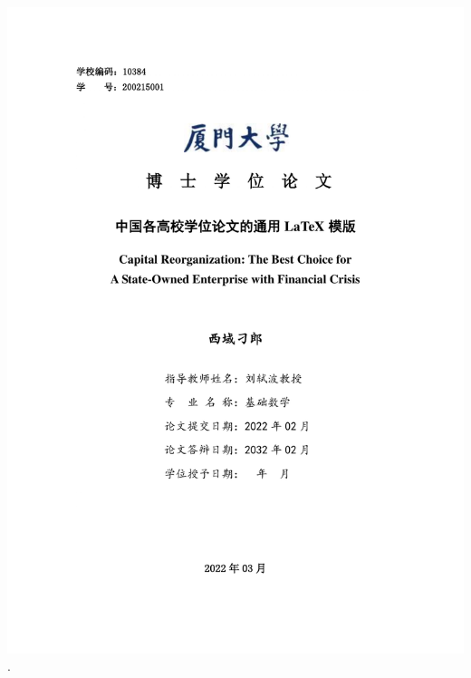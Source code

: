 \documentclass[12pt]{ctexbook}
\newcommand{\chap}[1]{\chapter{#1}\fancyhead[CE]{第\CJKnumber{\thechapter}章\quad
#1}\fancyhead[CO]{\S\rightmark}}
\theoremstyle{definition}
\theoremstyle{remark}
\begin{document}

\pagestyle{empty}
\vspace*{-10pt}
\hspace{-20pt}\includegraphics[clip,viewport=88 104 506 767,width=418pt]{cov}\newpage.\newpage
\end{document}
